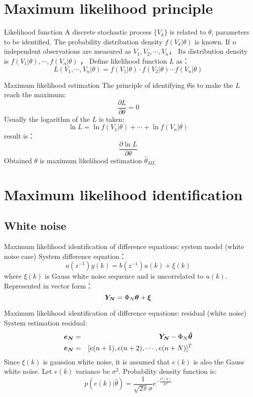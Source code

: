 \section{Maximum likelihood principle}

\begin{frame}{Likelihood function}
A discrete stochastic process $\{V_k\}$ is related to $\theta$, parameters to be identified. The  probability distribution density  $f(V_k|\theta)$ is known.  If $n$ independent observations are measured  as $V_1,V_2,\cdots,V_n$，  Its distribution density is $f(V_1|\theta),\cdots,f(V_n|\theta)$ ， Define likelihood function $L$ as：
$$L(V_1,\cdots,V_n|\theta)=f(V_1|\theta)\cdot f(V_2|\theta)\cdots f(V_n|\theta)$$
\end{frame}

\begin{frame}{ Maximum likelihood estimation }
The principle of identifying $\theta$is to make the $L$reach the maximum: 
$$\frac{\partial L}{\partial \theta}=0$$
 Usually the logarithm of the $L$ is taken: 
$$\ln L = \ln f(V_1|\theta)+\cdots + \ln f(V_n|\theta)$$
result is：
$$\frac{\partial \ln L}{\partial \theta}$$
Obtained $\theta$ is  maximum likelihood estimation $\hat\theta_{ML}$
\end{frame}

\section{ Maximum likelihood identification }
\subsection{White noise}
\begin{frame}{Maximum likelihood identification of difference equations: system model (white noise case) }
System difference equation：
$$a(z^{-1})y(k)=b(z^{-1})u(k)+\xi(k)$$
where $\xi(k)$ is  Gauss white noise sequence and is uncorrelated to $u(k)$. Represented in vector form：
$$\boldsymbol{Y_N}=\Phi_N\boldsymbol{\theta}+\boldsymbol{\xi}$$
\end{frame}

\begin{frame}{ Maximum likelihood identification of difference equations: residual (white noise) }
 System estimation residual: 
\begin{eqnarray*}
\boldsymbol{e_N} &=& \boldsymbol{Y_N}-\Phi_N\boldsymbol{\hat\theta} \\
\boldsymbol{e_N} &=& [e(n+1),  e(n+2), \cdots, e(n+N)]^T
\end{eqnarray*}
Since $\xi(k)$ is gaussion white noise, it is assumed that $e(k)$ is also the Gauss white noise.
Let $e(k)$ variance be $\sigma^2$. Probability density function is: 
$$p(e(k)|\hat\theta)=\frac{1}{\sqrt{2\pi}\sigma}e^{-\frac{e^2(k)}{2\sigma^2}}$$
\end{frame}

